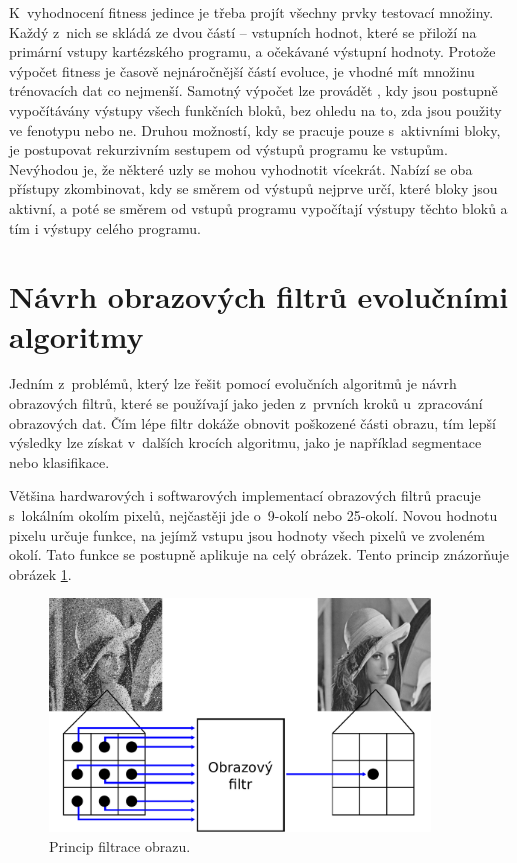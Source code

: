 K~vyhodnocení fitness jedince je třeba projít všechny prvky testovací množiny. Každý z~nich se skládá ze dvou částí -- vstupních hodnot, které se přiloží na primární vstupy kartézského programu, a očekávané výstupní hodnoty. Protože výpočet fitness je časově nejnáročnější částí evoluce, je vhodné mít množinu trénovacích dat co nejmenší. Samotný výpočet lze provádět , kdy jsou postupně vypočítávány výstupy všech funkčních bloků, bez ohledu na to, zda jsou použity ve fenotypu nebo ne. Druhou možností, kdy se pracuje pouze s~aktivními bloky, je postupovat rekurzivním sestupem od výstupů programu ke vstupům. Nevýhodou je, že některé uzly se mohou vyhodnotit vícekrát. Nabízí se oba přístupy zkombinovat, kdy se směrem od výstupů nejprve určí, které bloky jsou aktivní, a poté se směrem od vstupů programu vypočítají výstupy těchto bloků a tím i výstupy celého programu.

\section{Návrh obrazových filtrů evolučními algoritmy}

Jedním z~problémů, který lze řešit pomocí evolučních algoritmů je návrh obrazových filtrů, které se používají jako jeden z~prvních kroků u~zpracování obrazových dat. Čím lépe filtr dokáže obnovit poškozené části obrazu, tím lepší výsledky lze získat v~dalších krocích algoritmu, jako je například segmentace nebo klasifikace.

Většina hardwarových i softwarových implementací obrazových filtrů pracuje s~lokálním okolím pixelů, nejčastěji jde o~9-okolí nebo 25-okolí. Novou hodnotu pixelu určuje funkce, na jejímž vstupu jsou hodnoty všech pixelů ve zvoleném okolí. Tato funkce se postupně aplikuje na celý obrázek. Tento princip znázorňuje obrázek \ref{obrIFokoli}.

\begin{figure}[htb]
    \centering\includegraphics[width=0.9\textwidth]{fig/filter.pdf}
    \caption{Princip filtrace obrazu.}
    \label{obrIFokoli}
\end{figure}

